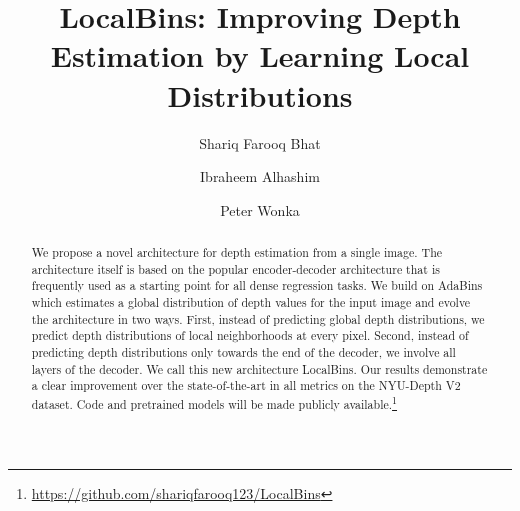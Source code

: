 \documentclass[runningheads]{llncs}
\begin{document}
\pagestyle{headings}
\mainmatter
\def\ECCVSubNumber{****}  

\title{LocalBins: Improving Depth Estimation by Learning Local Distributions} 

\begin{comment}
\titlerunning{ECCV-22 submission ID \ECCVSubNumber} 
\authorrunning{ECCV-22 submission ID \ECCVSubNumber} 
\author{Anonymous ECCV submission}
\institute{Paper ID \ECCVSubNumber}

\end{comment}




\author{Shariq Farooq Bhat \and
Ibraheem Alhashim \and
Peter Wonka}






\maketitle

\begin{abstract}
We propose a novel architecture for depth estimation from a single image. The architecture itself is based on the popular encoder-decoder architecture that is frequently used as a starting point for all dense regression tasks.
We build on AdaBins which estimates a global distribution of depth values for the input image and evolve the architecture in two ways. 
First, instead of predicting global depth distributions, we predict depth distributions of local neighborhoods at every pixel.
Second, instead of predicting depth distributions only towards the end of the decoder, we involve all layers of the decoder.
We call this new architecture LocalBins. Our results demonstrate a clear improvement over the state-of-the-art in all metrics on the NYU-Depth V2  dataset. Code and pretrained models will be made publicly available.\footnote{\url{https://github.com/shariqfarooq123/LocalBins}}

\end{abstract}
\end{document}
